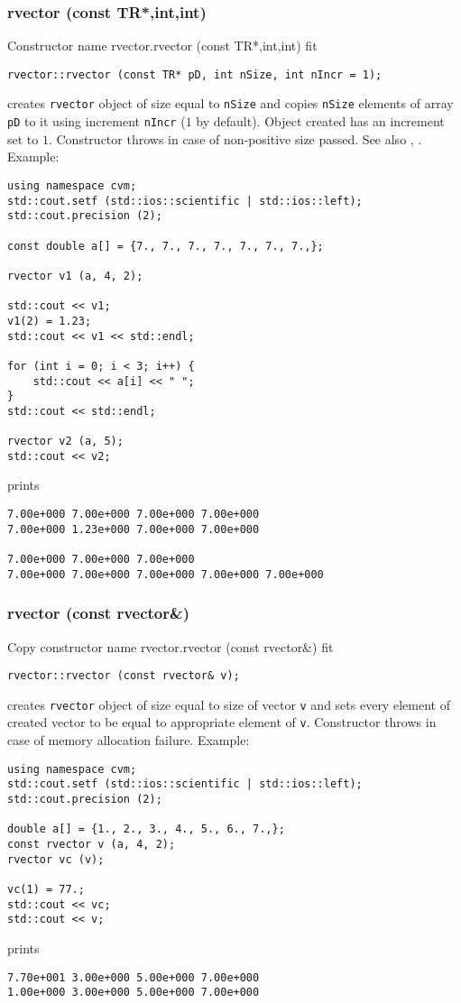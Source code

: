 \subsubsection{rvector (const TR*,int,int)}
Constructor%
\pdfdest name {rvector.rvector (const TR*,int,int)} fit
\begin{verbatim}
rvector::rvector (const TR* pD, int nSize, int nIncr = 1);
\end{verbatim}
creates \verb"rvector" object of size equal to \verb"nSize"
and copies \verb"nSize" elements of
 array \verb"pD" to it using increment \verb"nIncr" ($1$ by default).
Object created has an increment set to $1$.
Constructor throws  
in case of non-positive size passed.
See also , .
Example:
\begin{Verbatim}
using namespace cvm;
std::cout.setf (std::ios::scientific | std::ios::left); 
std::cout.precision (2);

const double a[] = {7., 7., 7., 7., 7., 7., 7.,};

rvector v1 (a, 4, 2);

std::cout << v1;
v1(2) = 1.23;
std::cout << v1 << std::endl;

for (int i = 0; i < 3; i++) {
    std::cout << a[i] << " ";
}
std::cout << std::endl;

rvector v2 (a, 5);
std::cout << v2;
\end{Verbatim}
prints
\begin{Verbatim}
7.00e+000 7.00e+000 7.00e+000 7.00e+000
7.00e+000 1.23e+000 7.00e+000 7.00e+000

7.00e+000 7.00e+000 7.00e+000
7.00e+000 7.00e+000 7.00e+000 7.00e+000 7.00e+000
\end{Verbatim}
\newpage




\subsubsection{rvector (const rvector\&)}
Copy constructor%
\pdfdest name {rvector.rvector (const rvector&)} fit
\begin{verbatim}
rvector::rvector (const rvector& v);
\end{verbatim}         
creates \verb"rvector" object of size equal to size of
vector \verb"v" and sets every element of created vector to be equal to
appropriate element of \verb"v".
Constructor throws  
in case of memory allocation failure.
Example:
\begin{Verbatim}
using namespace cvm;
std::cout.setf (std::ios::scientific | std::ios::left); 
std::cout.precision (2);

double a[] = {1., 2., 3., 4., 5., 6., 7.,};
const rvector v (a, 4, 2);
rvector vc (v);

vc(1) = 77.;
std::cout << vc;
std::cout << v;
\end{Verbatim}
prints
\begin{Verbatim}
7.70e+001 3.00e+000 5.00e+000 7.00e+000
1.00e+000 3.00e+000 5.00e+000 7.00e+000
\end{Verbatim}
\newpage



